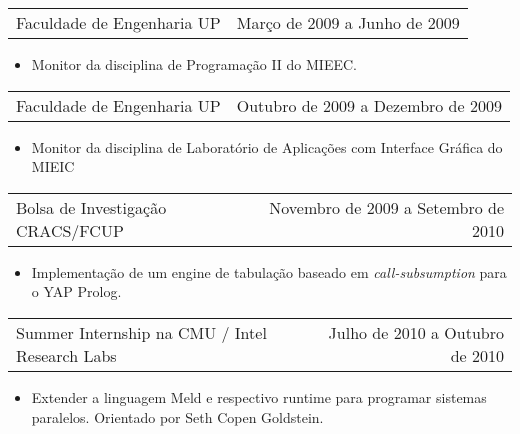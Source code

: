 \documentclass[margin]{res}
\begin{document}
\begin{resume}
                 \begin{tabular}{p{3in} r} %
                  Faculdade de Engenharia UP &  Março de 2009 a Junho de 2009
                 \end{tabular}
                  \begin{itemize}					        
                   \item[] Monitor da disciplina de Programação II do MIEEC.
                  \end{itemize}
                  
                  \begin{tabular}{p{3in} r} %
                    Faculdade de Engenharia UP &  Outubro de 2009 a Dezembro de 2009
                   \end{tabular}
                    \begin{itemize}					        
                     \item[] Monitor da disciplina de Laboratório de Aplicações com Interface Gráfica do MIEIC
                    \end{itemize}
                    
                  \begin{tabular}{p{3in} r}
                    Bolsa de Investigação CRACS/FCUP & Novembro de 2009 a Setembro de 2010
                  \end{tabular}
                  \begin{itemize}
                    \item[] Implementação de um engine de tabulação baseado em \textit{call-subsumption}
                    para o YAP Prolog.
                  \end{itemize}
                  
                  \begin{tabular}{p{3in} r}
                    Summer Internship na CMU / Intel Research Labs & Julho de 2010 a Outubro de 2010
                  \end{tabular}
                  \begin{itemize}
                     \item[] Extender a linguagem Meld e respectivo runtime para programar sistemas paralelos. Orientado por Seth Copen Goldstein.
                  \end{itemize}

\clearpage

\end{resume}
\end{document}
